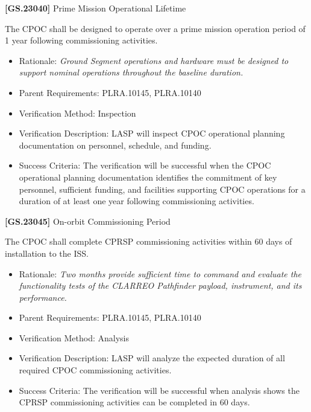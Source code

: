 \documentclass[12pt,oneside,oldfontcommands]{memoir}
\begin{document}
\textbf{[GS.23040]} Prime Mission Operational Lifetime

The \gls{CPOC} shall be designed to operate over a prime mission operation period of 1 year following commissioning activities.

\begin{itemize}
\item{} Rationale: \emph{Ground Segment operations and hardware must be designed to support nominal operations throughout the baseline duration.}

\item{} Parent Requirements: PLRA.10145, PLRA.10140

\item{} Verification Method: Inspection

\item{} Verification Description: \gls{LASP} will inspect \gls{CPOC} operational planning documentation on personnel, schedule, and funding.

\item{} Success Criteria: The verification will be successful when the \gls{CPOC} operational planning documentation identifies the commitment of key personnel, sufficient funding, and facilities supporting \gls{CPOC} operations for a duration of at least one year following commissioning activities.

\end{itemize}

\textbf{[GS.23045]} On-orbit Commissioning Period

The \gls{CPOC} shall complete \gls{CPRSP} commissioning activities within 60 days of installation to the \gls{ISS}.

\begin{itemize}
\item{} Rationale: \emph{Two months provide sufficient time to command and evaluate the functionality tests of the CLARREO Pathfinder payload, instrument, and its performance.}

\item{} Parent Requirements: PLRA.10145, PLRA.10140

\item{} Verification Method: Analysis

\item{} Verification Description: \gls{LASP} will analyze the expected duration of all required \gls{CPOC} commissioning activities.

\item{} Success Criteria: The verification will be successful when \gls{analysis} shows the \gls{CPRSP} commissioning activities can be completed in 60 days.

\end{itemize}
\end{document}

